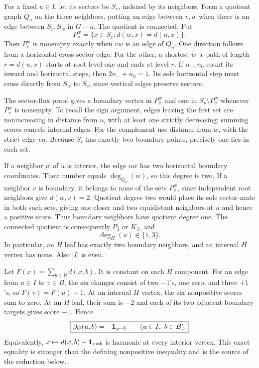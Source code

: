 For a fixed $u\in I$, let its sectors be $S_v$, indexed by its neighbors.
Form a quotient graph $Q_u$ on the three neighbors, putting an edge
between $v,w$ when there is an edge between $S_v,S_w$ in $G-u$.
The quotient is connected. Put
\[
 P_v^w=\{x\in S_v:d(w,x)=d(u,x)\}.
\]
Then $P_v^w$ is nonempty exactly when $vw$ is an edge of $Q_u$.
One direction follows from a horizontal cross-sector edge. For the other,
a shortest $w$--$x$ path of length $r=d(u,x)$ starts at root level one
and ends at level $r$. If $n_-,n_0$ count its inward and horizontal steps,
then $2n_-+n_0=1$. Its sole horizontal step must cross directly from
$S_w$ to $S_v$, since vertical edges preserve sectors.

The sector-flux proof gives a boundary vertex in $P_v^w$ and one in
$S_v\setminus P_v^w$ whenever $P_v^w$ is nonempty. To recall the sign
argument, edges leaving the first set are nonincreasing in distance
from $u$, with at least one strictly decreasing; summing scores cancels
internal edges. For the complement use distance from $w$, with the
strict edge $vu$. Because $S_v$ has exactly two boundary points, precisely
one lies in each set.

If a neighbor $w$ of $u$ is interior, the edge $uw$ has two horizontal
boundary coordinates. Their number equals $\deg_{Q_u}(w)$, so this degree
is two. If a neighbor $v$ is boundary, it belongs to none of the sets
$P_v^w$, since independent root neighbors give $d(w,v)=2$. Quotient
degree two would place its sole sector-mate in both such sets, giving
one closer and two equidistant neighbors at $u$ and hence a positive
score. Thus boundary neighbors have quotient degree one. The connected
quotient is consequently $P_3$ or $K_3$, and
\begin{equation}\label{eq:subcubic-H-degree}
 \deg_H(u)\in\{1,3\}.
\end{equation}
In particular, an $H$ leaf has exactly two boundary neighbors, and an
internal $H$ vertex has none. Also $|I|$ is even.

Let $F(x)=\sum_{b\in B}d(x,b)$. It is constant on each $H$ component.
For an edge from $u\in I$ to $v\in B$, the six changes consist of two
$-1$'s, one zero, and three $+1$'s, so $F(v)=F(u)+1$.
At an internal $H$ vertex, the six nonpositive scores sum to zero.
At an $H$ leaf, their sum is $-2$ and each of its two adjacent boundary
targets gives score $-1$. Hence
\begin{equation}\label{eq:subcubic-exact-score}
 \boxed{\beta_G(u,b)=-\mathbf 1_{u\sim b}\qquad(u\in I,\ b\in B).}
\end{equation}
Equivalently, $x\mapsto d(x,b)-\mathbf 1_{x=b}$ is harmonic at every interior
vertex. This exact equality is stronger than the defining nonpositive
inequality and is the source of the reduction below.

